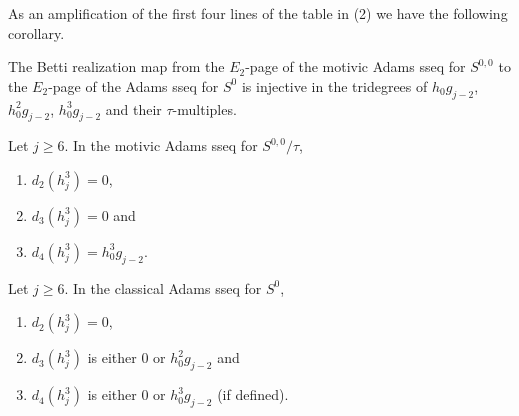 
As an amplification of the first four lines of the table in (2) we have the following corollary.

\begin{cor} \label{cor:E2 inj}
  The Betti realization map from 
  the $E_2$-page of the motivic Adams sseq for $S^{0,0}$ to
  the $E_2$-page of the Adams sseq for $S^{0}$ is
  injective in the tridegrees of $h_0g_{j-2}$, $h_0^2 g_{j-2}$, $h_0^3 g_{j-2}$ and their $\tau$-multiples.
\end{cor}



\begin{thm} \label{diff motivic ctau}
  Let $j \geq 6$.
  In the motivic Adams sseq for $S^{0,0}/\tau$, 
  \begin{enumerate}
  \item $d_2(h_j^3) = 0$,
  \item $d_3(h_j^3) = 0$ and 
  \item $d_4(h_j^3) = h_0^3 g_{j-2}$.
  \end{enumerate}
\end{thm}

\begin{thm} \label{prop:diff classical}
  Let $j \geq 6$. In the classical Adams sseq for $S^{0}$, 
  \begin{enumerate}
  \item $d_2(h_j^3) = 0$,
  \item $d_3(h_j^3)$ is either $0$ or $h_0^2g_{j-2}$ and
  \item $d_4(h_j^3)$ is either $0$ or $h_0^3g_{j-2}$ (if defined).
  \end{enumerate}  
\end{thm}

